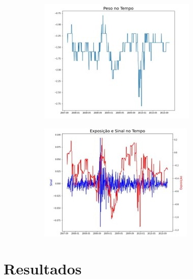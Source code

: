 \begin{figure}
    \begin{subfigure}{0.45\linewidth}
        \includegraphics[width = \textwidth]{relatorios/consult/imagens/Imagem1.jpg}
    \end{subfigure}
    \hfill
    \begin{subfigure}{0.45\linewidth}
        \includegraphics[width = \textwidth]{relatorios/consult/imagens/Imagem2.jpg}
    \end{subfigure}
\end{figure}

\section{Resultados}

